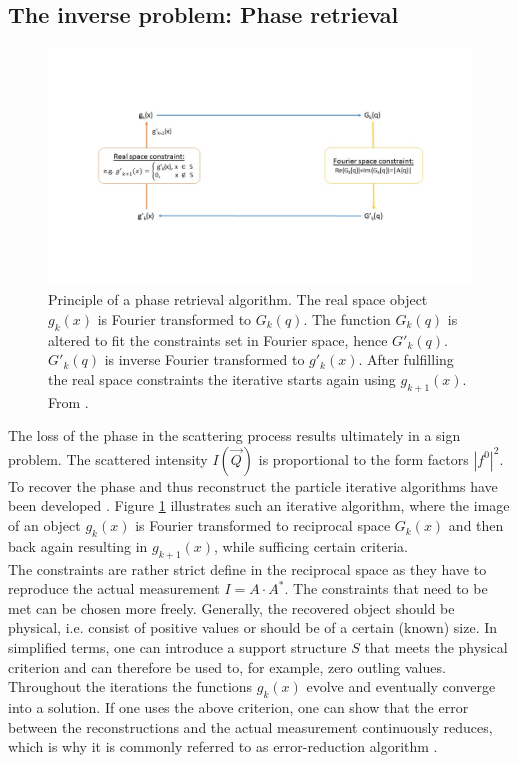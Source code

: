 \subsection{The inverse problem: Phase retrieval}
\begin{figure}
	\centering
		\includegraphics[width=1.00\textwidth]{images/phase-retrieval-algorithm.jpg}
	\caption[Principle of a phase retrieval algorithm.]{Principle of a phase retrieval algorithm. The real space object $g_{k}\left(x\right)$ is Fourier transformed to $G_{k}\left(q\right)$. The function $G_{k}\left(q\right)$ is altered to fit the constraints set in Fourier space, hence $G'_{k}\left(q\right)$. $G'_{k}\left(q\right)$ is inverse Fourier transformed to $g'_{k}\left(x\right)$. After fulfilling the real space constraints the iterative starts again using $g_{k+1}\left(x\right)$. From \citep{Fienup-1982-AO}.}
	\label{fig:phase-retrieval-algorithm}
\end{figure}
The loss of the phase in the scattering process results ultimately in a sign problem. The scattered intensity $I\left(\vec{Q}\right)$ is proportional to the form factors $\left|f^{0}\right|^{2}$. To recover the phase and thus reconstruct the particle iterative algorithms have been developed \cite{Fienup-1982-AO}. Figure \ref{fig:phase-retrieval-algorithm} illustrates such an iterative algorithm, where the image of an object $g_{k}\left(x\right)$ is Fourier transformed to reciprocal space $G_{k}\left(x\right)$ and then back again resulting in $g_{k+1}(x)$, while sufficing certain criteria.\\
The constraints are rather strict define in the reciprocal space as they have to reproduce the actual measurement $I=A\cdot A^{*}$. The constraints that need to be met can be chosen more freely. Generally, the recovered object should be physical, i.e. consist of positive values or should be of a certain (known) size. In simplified terms, one can introduce a support structure $S$ that meets the physical criterion and can therefore be used to, for example, zero outling values. Throughout the iterations the functions $g_{k}(x)$ evolve and eventually converge into a solution. If one uses the above criterion, one can show that the error between the reconstructions and the actual measurement continuously reduces, which is why it is commonly referred to as error-reduction algorithm \cite{Fienup-1978-OL}.\\
